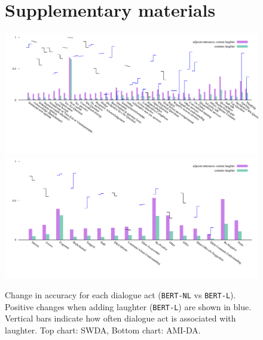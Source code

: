 \documentclass[11pt,a4paper]{article}
\begin{document}


\clearpage
\appendix
\begin{figure}[h!]
  \section{Supplementary materials}\label{sec:suppl}
  \centering
  \includegraphics[width=\linewidth]{img/SWDA-bertLvsNL.pdf}
  \includegraphics[width=\linewidth]{img/AMI-DA-bertLvsNL.pdf}
  \caption{Change in accuracy for each dialogue act (\texttt{BERT-NL} vs \texttt{BERT-L}). Positive changes when adding laughter (\texttt{BERT-L}) are shown in blue. Vertical bars indicate how often dialogue act is associated with laughter. Top chart: SWDA, Bottom chart: AMI-DA. }
    \label{fig:by-da}
  \end{figure}
\end{document}
